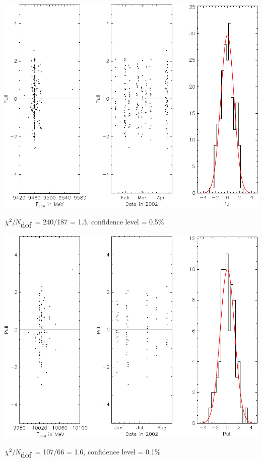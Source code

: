 \documentclass[landscape]{article}
\newcommand{\subs}[1]{{\mbox{\large #1}}}
\begin{document}
\begin{slide:fitting}

\begin{center}
\includegraphics[width=0.8\linewidth]{plots/pulls1}
\end{center}

$\chi^2/N_\subs{dof}$ = 240/187 = 1.3, confidence level = 0.5\%

\end{slide:fitting}

\begin{slide:fitting}

\begin{center}
\includegraphics[width=0.8\linewidth]{plots/pulls2}
\end{center}

$\chi^2/N_\subs{dof}$ = 107/66 = 1.6, confidence level = 0.1\%

\end{slide:fitting}
\end{document}
